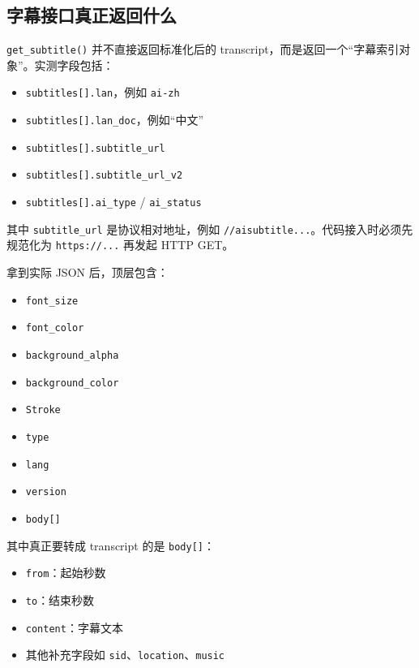 \documentclass[a4paper]{article}
\begin{document}
\subsection{字幕接口真正返回什么}

\texttt{get\_subtitle()} 并不直接返回标准化后的 transcript，而是返回一个“字幕索引对象”。实测字段包括：
\begin{itemize}
\item \texttt{subtitles[].lan}，例如 \texttt{ai-zh}
\item \texttt{subtitles[].lan\_doc}，例如“中文”
\item \texttt{subtitles[].subtitle\_url}
\item \texttt{subtitles[].subtitle\_url\_v2}
\item \texttt{subtitles[].ai\_type} / \texttt{ai\_status}
\end{itemize}

其中 \texttt{subtitle\_url} 是协议相对地址，例如 \texttt{//aisubtitle...}。代码接入时必须先规范化为 \texttt{https://...} 再发起 HTTP GET。

拿到实际 JSON 后，顶层包含：
\begin{itemize}
\item \texttt{font\_size}
\item \texttt{font\_color}
\item \texttt{background\_alpha}
\item \texttt{background\_color}
\item \texttt{Stroke}
\item \texttt{type}
\item \texttt{lang}
\item \texttt{version}
\item \texttt{body[]}
\end{itemize}

其中真正要转成 transcript 的是 \texttt{body[]}：
\begin{itemize}
\item \texttt{from}：起始秒数
\item \texttt{to}：结束秒数
\item \texttt{content}：字幕文本
\item 其他补充字段如 \texttt{sid}、\texttt{location}、\texttt{music}
\end{itemize}
\end{document}
